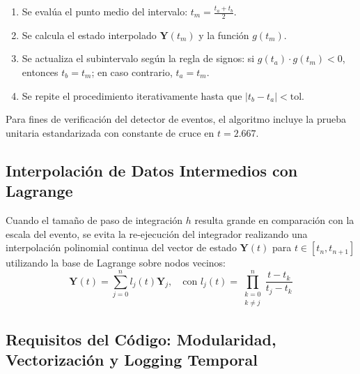 \documentclass[11pt, a4paper]{article}
\begin{document}
	\begin{enumerate}
		\item Se evalúa el punto medio del intervalo: $t_m = \frac{t_a + t_b}{2}$.
		\item Se calcula el estado interpolado $\mathbf{Y}(t_m)$ y la función $g(t_m)$.
		\item Se actualiza el subintervalo según la regla de signos: si $g(t_a) \cdot g(t_m) < 0$, entonces $t_b = t_m$; en caso contrario, $t_a = t_m$.
		\item Se repite el procedimiento iterativamente hasta que $\vert{}t_b - t_a\vert{} < \text{tol}$.
	\end{enumerate}
	
	Para fines de verificación del detector de eventos, el algoritmo incluye la prueba unitaria estandarizada con constante de cruce en $t = 2.667$.
	
	\subsection{Interpolación de Datos Intermedios con Lagrange}
	
	Cuando el tamaño de paso de integración $h$ resulta grande en comparación con la escala del evento, se evita la re-ejecución del integrador realizando una interpolación polinomial continua del vector de estado $\mathbf{Y}(t)$ para $t \in [t_n, t_{n+1}]$ utilizando la base de Lagrange sobre nodos vecinos:
	\begin{equation}
		\mathbf{Y}(t) = \sum_{j=0}^{n} l_j(t) \mathbf{Y}_j, \quad \text{con } l_j(t) = \prod_{\substack{k=0 \\ k \neq j}}^{n} \frac{t - t_k}{t_j - t_k}
	\end{equation}
	
	\subsection{Requisitos del Código: Modularidad, Vectorización y Logging Temporal}
	
\end{document}
